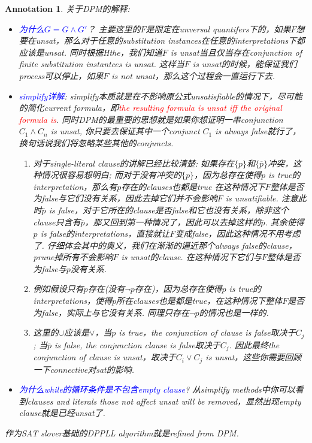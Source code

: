 \documentclass{article}
\theoremstyle{plain}
\newtheorem{annotation}[theorem]{Annotation}
\theoremstyle{nonumberplain}
\newcommand{\redt}[1]{\textcolor{red}{#1}}
\newcommand{\bluet}[1]{\textcolor{blue}{#1}}
\begin{document}
\begin{annotation}
\rm 关于DPM的解释: 
\begin{itemize}
	\item \bluet{为什么$G = G \wedge G'$}？ 主要这里的$F$是限定在unversal quantifers下的，如果$F$想要在unsat，那么对于任意的substitution instances在任意的interpretations下都应该是unsat. 同时根据Hthe，我们知道$F$ is unsat当且仅当存在conjunction of finite substitution instantces is unsat. 这样当$F$ is unsat的时候，能保证我们process可以停止，如果$F$ is not unsat，那么这个过程会一直运行下去. 
	\item \bluet{simplify详解}: simplify本质就是在不影响原公式unsatisfiable的情况下，尽可能的简化current formula，即\redt{the resulting formula is unsat iff the original formula is}. 同时DPM的最重要的思想就是如果你想证明一串conjunction $C_1 \wedge C_n$ is unsat, 你只要去保证其中一个conjunct $C_1$ is always false就行了，换句话说我们将忽略某些其他的conjuncts.
	\begin{enumerate}
		\item 对于single-literal clause的讲解已经比较清楚: 如果存在$\{p\}$和$\{\overline{p}\}$冲突，这种情况很容易想明白; 而对于没有冲突的$\{p\}$，因为总存在使得$p$ is true的interpretation，那么有$p$存在的clauses也都是true 在这种情况下$F$整体是否为false与它们没有关系，因此去掉它们并不会影响$F$ is unsatifiable. 注意此时$\overline{p}$ is false，对于它所在的clause是否false和它也没有关系，除非这个clause只含有$\overline{p}$，那又回到第一种情况了，因此可以去掉这样的$\overline{p}$. 其余使得$p$ is false的interpretations，直接就让$F$变成false，因此这种情况不用考虑了. 仔细体会其中的奥义，我们在渐渐的逼近那个always false的clause，prune掉所有不会影响$F$ is unsat的clause.
		在这种情况下它们与$F$整体是否为false与$p$没有关系. 
		\item 例如假设只有$p$存在(没有$\neg p$存在)，因为总存在使得$p$ is true的interpretations，使得$p$所在clauses也是都是true，在这种情况下整体$F$是否为false，实际上与它没有关系. 同理只存在$\neg p$的情况也是一样的. 
		\item 这里的$\cup$应该是$\vee$，当$p$ is true，the conjunction of clause is false取决于$C_j$; 当$\overline{p}$ is false, the conjunction clause is false取决于$C_j$. 因此最终the conjunction of clause is unsat，取决于$C_i \vee C_j$ is unsat，这些你需要回顾一下connective对sat的影响.
	\end{enumerate}
	\item \bluet{为什么while的循环条件是不包含\emph{empty clause}}? 从simplify methods中你可以看到clauses and literals those not affect unsat will be removed，显然出现empty clause就是已经unsat了.
\end{itemize}
作为SAT slover基础的DPPLL algorithm就是refined from DPM.
\end{annotation}
\end{document}
